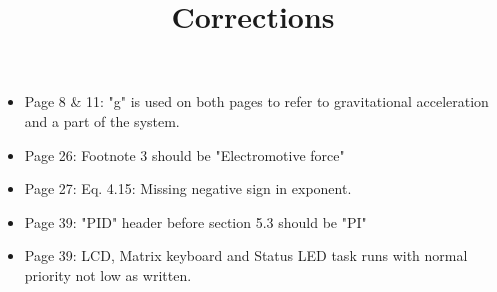 \documentclass[a4paper,11pt]{article}
\begin{document}
\title{Corrections}
\date{}
\maketitle
\vspace{-2cm}

\begin{itemize}
    \item Page 8 \& 11: "g" is used on both pages to refer to gravitational acceleration and a part of the system.    
    \item Page 26: Footnote 3 should be "Electromotive force" 
    \item Page 27: Eq. 4.15: Missing negative sign in exponent.
    \item Page 39: "PID" header before section 5.3 should be "PI"
    \item Page 39: LCD, Matrix keyboard and Status LED task runs with normal priority not low as written. 
\end{itemize}
\end{document}
